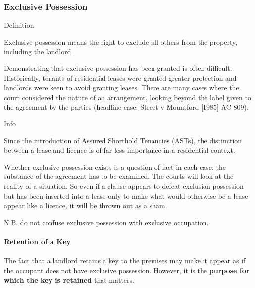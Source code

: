 \documentclass[
]{article}
\newenvironment{env-ab392b14-a05f-4d9a-80eb-a63d00eb59ea}
{
    \savenotes\tcolorbox[blanker,breakable,left=5pt,borderline west={2pt}{-4pt}{gold}]
}
{
    \endtcolorbox\spewnotes
}
\newenvironment{env-fdd3b853-72b2-4779-a214-b5da0ccdb5e7}
{
    \savenotes\tcolorbox[blanker,breakable,left=5pt,borderline west={2pt}{-4pt}{gray}]
}
{
    \endtcolorbox\spewnotes
}
\begin{document}
\hypertarget{exclusive-possession}{%
\subsubsection{Exclusive Possession}\label{exclusive-possession}}

\begin{env-ab392b14-a05f-4d9a-80eb-a63d00eb59ea}

Definition

Exclusive possession means the right to exclude all others from the
property, including the landlord.

\end{env-ab392b14-a05f-4d9a-80eb-a63d00eb59ea}

Demonstrating that exclusive possession has been granted is often
difficult. Historically, tenants of residential leases were granted
greater protection and landlords were keen to avoid granting leases.
There are many cases where the court considered the nature of an
arrangement, looking beyond the label given to the agreement by the
parties (headline case: Street v Mountford {[}1985{]} AC 809).

\begin{env-fdd3b853-72b2-4779-a214-b5da0ccdb5e7}

Info

Since the introduction of Assured Shorthold Tenancies (ASTs), the
distinction between a lease and licence is of far less importance in a
residential context.

\end{env-fdd3b853-72b2-4779-a214-b5da0ccdb5e7}

Whether exclusive possession exists is a question of fact in each case:
the substance of the agreement has to be examined. The courts will look
at the reality of a situation. So even if a clause appears to defeat
exclusion possession but has been inserted into a lease only to make
what would otherwise be a lease appear like a licence, it will be thrown
out as a sham.

N.B. do not confuse exclusive possession with exclusive occupation.

\hypertarget{retention-of-a-key}{%
\paragraph{Retention of a Key}\label{retention-of-a-key}}

The fact that a landlord retains a key to the premises may make it
appear as if the occupant does not have exclusive possession. However,
it is the \textbf{purpose for which the key is retained} that matters.
\end{document}
